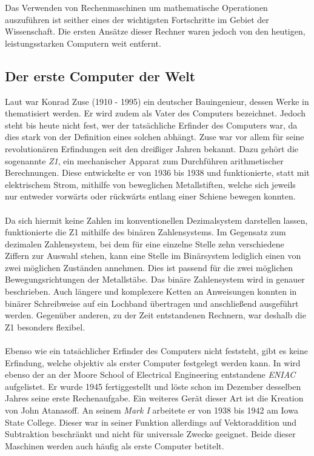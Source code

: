Das Verwenden von Rechenmaschinen um mathematische Operationen auszuführen ist seither eines der wichtigsten Fortschritte im Gebiet der Wissenschaft. Die ersten Ansätze dieser Rechner waren jedoch von den heutigen, leistungsstarken Computern weit entfernt.
\subsection{Der \glqq{}erste Computer\grqq{} der Welt}
Laut \cite{bruderer2011konrad} war Konrad Zuse (1910 - 1995) ein deutscher Bauingenieur, dessen Werke in \cite{konradz1z2} thematisiert werden. Er wird zudem als \glqq{}Vater des Computers\grqq{} bezeichnet. Jedoch steht bis heute nicht fest, wer der tatsächliche Erfinder des Computers war, da dies stark von der Definition eines solchen abhängt. Zuse war vor allem für seine revolutionären Erfindungen seit den dreißiger Jahren bekannt. Dazu gehört die sogenannte \textit{Z1}, ein mechanischer Apparat zum Durchführen arithmetischer Berechnungen. Diese entwickelte er von 1936 bis 1938 und funktionierte, statt mit elektrischem Strom, mithilfe von beweglichen Metallstiften, welche sich jeweils nur entweder vorwärts oder rückwärts entlang einer Schiene bewegen konnten.\\\\
Da sich hiermit keine Zahlen im konventionellen Dezimalsystem darstellen lassen, funktionierte die Z1 mithilfe des binären Zahlensystems. Im Gegensatz zum dezimalen Zahlensystem, bei dem für eine einzelne Stelle zehn verschiedene Ziffern zur Auswahl stehen, kann eine Stelle im Binärsystem lediglich einen von zwei möglichen Zuständen annehmen. Dies ist passend für die zwei möglichen Bewegungsrichtungen der Metallstäbe. Das binäre Zahlensystem wird in  genauer beschrieben. Auch längere und komplexere Ketten an Anweisungen konnten in binärer Schreibweise auf ein Lochband übertragen und anschließend ausgeführt werden. Gegenüber anderen, zu der Zeit entstandenen Rechnern, war deshalb die Z1 besonders flexibel.\\\\
Ebenso wie ein tatsächlicher Erfinder des Computers nicht feststeht, gibt es keine Erfindung, welche objektiv als \glqq{}erster Computer\grqq{} festgelegt werden kann. In \cite{konradz1z2} wird ebenso der an der Moore School of Electrical Engineering entstandene \glqq{}\textit{ENIAC}\grqq{} aufgelistet. Er wurde 1945 fertiggestellt und löste schon im Dezember desselben Jahres seine erste Rechenaufgabe. Ein weiteres Gerät dieser Art ist die Kreation von John Atanasoff. An seinem \glqq{}\textit{Mark I}\grqq{} arbeitete er von 1938 bis 1942 am Iowa State College. Dieser war in seiner Funktion allerdings auf Vektoraddition und Subtraktion beschränkt und nicht für universale Zwecke geeignet. Beide dieser Maschinen werden auch häufig als \glqq{}erste Computer\grqq{} betitelt.\\\\
